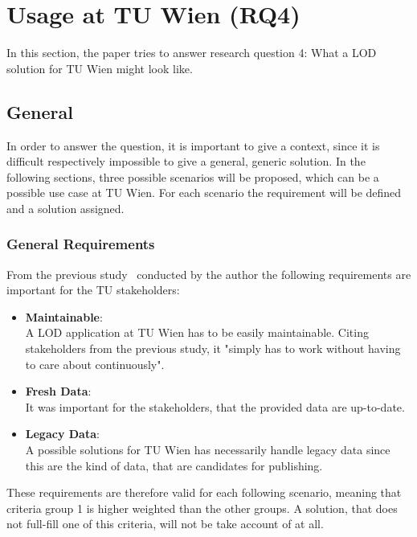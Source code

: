 \chapter{Usage at TU Wien (RQ4)}\label{ch:tuwien}

In this section, the paper tries to answer research question 4: What a LOD solution for TU Wien might look like.

\section{General}
In order to answer the question, it is important to give a context, since it is difficult respectively impossible to give a general, generic solution. In the following sections, three possible scenarios will be proposed, which can be a possible use case at TU Wien. For each scenario the requirement will be defined and a solution assigned.

\subsection{General Requirements}
From the previous study~\cite{baronyai_publishing_2016} conducted by the author the following requirements are important for the TU stakeholders:

\begin{itemize}

\item \textbf{Maintainable}: \\
A LOD application at TU Wien has to be easily maintainable. Citing stakeholders from the previous study, it "simply has to work without having to care about continuously".

\item \textbf{Fresh Data}: \\
It was important for the stakeholders, that the provided data are up-to-date.

\item \textbf{Legacy Data}: \\
A possible solutions for TU Wien has necessarily handle legacy data since this are the kind of data, that are candidates for publishing.

\end{itemize}

These requirements are therefore valid for each following scenario, meaning that criteria group 1 is higher weighted than the other groups. A solution, that does not full-fill one of this criteria, will not be take account of at all.

